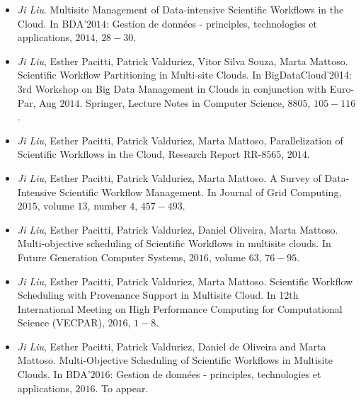 \begin{itemize}

\item \textit{Ji Liu}. Multisite Management of Data-intensive Scientific Workflows in the Cloud. In BDA’$2014$: Gestion de données - principles, technologies et applications, $2014$, $28-30$.

\item \textit{Ji Liu}, Esther Pacitti, Patrick Valduriez, Vitor Silva Souza, Marta Mattoso. Scientific Workflow Partitioning in Multi-site Clouds. In BigDataCloud'2014: 3rd Workshop on Big Data Management in Clouds in conjunction with Euro-Par, Aug $2014$. Springer, Lecture Notes in Computer Science, $8805$,  $105-116$.

\item \textit{Ji Liu}, Esther Pacitti, Patrick Valduriez, Marta Mattoso, Parallelization of Scientific Workflows in the Cloud, Research Report RR-$8565$, $2014$.

\item \textit{Ji Liu}, Esther Pacitti, Patrick Valduriez, Marta Mattoso. A Survey of Data-Intensive Scientific Workflow Management. In Journal of Grid Computing, $2015$, volume $13$, number $4$, $457-493$.

\item \textit{Ji Liu}, Esther Pacitti, Patrick Valduriez, Daniel Oliveira, Marta Mattoso. Multi-objective scheduling of Scientific Workflows in multisite clouds. In Future Generation Computer Systems, $2016$, volume $63$, $76-95$.

\item \textit{Ji Liu}, Esther Pacitti, Patrick Valduriez, Marta Mattoso. Scientific Workflow Scheduling with Provenance Support in Multisite Cloud. In 12th International Meeting on High Performance Computing for Computational Science (VECPAR), $2016$, $1-8$.

\item \textit{Ji Liu}, Esther Pacitti, Patrick Valduriez, Daniel de Oliveira and Marta Mattoso. Multi-Objective Scheduling of Scientific Workflows in Multisite Clouds. In BDA’$2016$: Gestion de données - principles, technologies et applications, $2016$. To appear.

\end{itemize}
